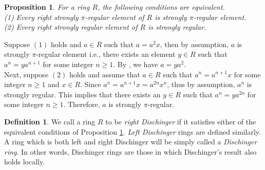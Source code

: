 \documentclass[12pt]{article}
\makeatletter
\theoremstyle{plain}
\newtheorem{prop}[thm]{Proposition}
\theoremstyle{definition}
\newtheorem{definition}[thm]{Definition}
\renewenvironment{proof}[1][\proofname]{%
	\par\pushQED{\qed}%
	\normalfont %
	\topsep6\p@\@plus6\p@\relax
	\trivlist
	\item[\hskip\labelsep\bfseries #1\@addpunct{.}]%
}{%
	\popQED\endtrivlist\@endpefalse
}
\renewcommand{\proofname}{Proof}
\makeatother
\begin{document}
	\begin{prop}\label{D.Def}
		For a ring $R$, the following conditions are equivalent.\\[2mm]
		\textup{(1)} Every right strongly $\pi$-regular element of $R$ is strongly $\pi$-regular element.  \\[2mm]
		\textup{(2)} Every right strongly regular element of $R$ is strongly regular.
	\end{prop}
\begin{proof} Suppose $(1)$ holds and $a \in R$ such that $a=a^2x$, then by assumption, $a$ is strongly $\pi$-regular element i.e., there exists an element $y \in R$ such that $a^n=ya^{n+1}$ for some integer $n \geq 1$. By \cite[Lemma 3]{Az}, we have $a=ya^2$.\\
 Next, suppose $(2)$ holds and assume that  $a \in R$ such that $a^n=a^{n+1}x$ for some integer $n \geq 1$ and $x \in R$. Since $a^n=a^{n+1}x=a^{2n}x^n$, thus by assumption, $a^n$ is strongly regular. This implies that there exists an $y \in R$ such that $a^n=ya^{2n}$ for some integer $n \geq 1$. Therefore, $a$ is strongly $\pi$-regular. 
\end{proof}
	\begin{definition}
		We call a ring $R$ to be {\em right Dischinger} if it satisfies either of the equivalent conditions of Proposition \ref{D.Def}. {\em Left Dischinger} rings are defined similarly. A ring which is both left and right Dischinger will be simply called a {\em Dischinger ring}. In other words, Dischinger rings are those in which Dischinger's result also holds locally. 
	\end{definition} 
\end{document}
